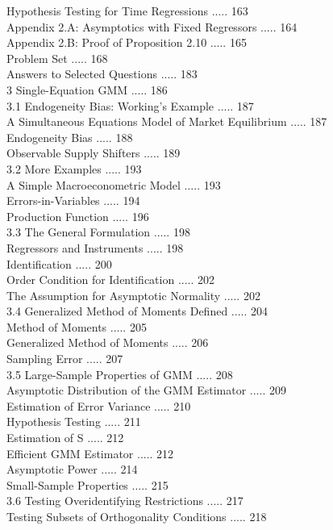 \documentclass[10pt]{article}
\begin{document}
Hypothesis Testing for Time Regressions ..... 163\\
Appendix 2.A: Asymptotics with Fixed Regressors ..... 164\\
Appendix 2.B: Proof of Proposition 2.10 ..... 165\\
Problem Set ..... 168\\
Answers to Selected Questions ..... 183\\
3 Single-Equation GMM ..... 186\\
3.1 Endogeneity Bias: Working's Example ..... 187\\
A Simultaneous Equations Model of Market Equilibrium ..... 187\\
Endogeneity Bias ..... 188\\
Observable Supply Shifters ..... 189\\
3.2 More Examples ..... 193\\
A Simple Macroeconometric Model ..... 193\\
Errors-in-Variables ..... 194\\
Production Function ..... 196\\
3.3 The General Formulation ..... 198\\
Regressors and Instruments ..... 198\\
Identification ..... 200\\
Order Condition for Identification ..... 202\\
The Assumption for Asymptotic Normality ..... 202\\
3.4 Generalized Method of Moments Defined ..... 204\\
Method of Moments ..... 205\\
Generalized Method of Moments ..... 206\\
Sampling Error ..... 207\\
3.5 Large-Sample Properties of GMM ..... 208\\
Asymptotic Distribution of the GMM Estimator ..... 209\\
Estimation of Error Variance ..... 210\\
Hypothesis Testing ..... 211\\
Estimation of S ..... 212\\
Efficient GMM Estimator ..... 212\\
Asymptotic Power ..... 214\\
Small-Sample Properties ..... 215\\
3.6 Testing Overidentifying Restrictions ..... 217\\
Testing Subsets of Orthogonality Conditions ..... 218\\
\end{document}
